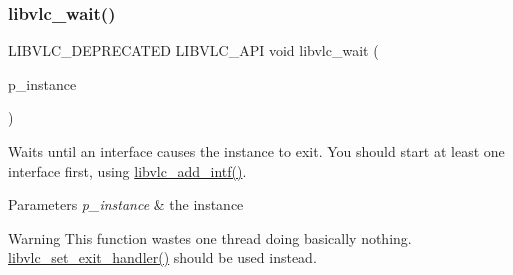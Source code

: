 \subsubsection{\texorpdfstring{libvlc\+\_\+wait()}{libvlc\_wait()}}
{\footnotesize\ttfamily L\+I\+B\+V\+L\+C\+\_\+\+D\+E\+P\+R\+E\+C\+A\+T\+ED L\+I\+B\+V\+L\+C\+\_\+\+A\+PI void libvlc\+\_\+wait (\begin{DoxyParamCaption}\item[{\hyperlink{group__libvlc__core_ga316d739a80da4678206c79f4d6c2e284}{libvlc\+\_\+instance\+\_\+t} $\ast$}]{p\+\_\+instance }\end{DoxyParamCaption})}

Waits until an interface causes the instance to exit. You should start at least one interface first, using \hyperlink{group__libvlc__core_gaee76d8daf854191af20a93eecea1dc6e}{libvlc\+\_\+add\+\_\+intf()}.


\begin{DoxyParams}{Parameters}
{\em p\+\_\+instance} & the instance \\
\hline
\end{DoxyParams}
\begin{DoxyWarning}{Warning}
This function wastes one thread doing basically nothing. \hyperlink{group__libvlc__core_ga9fb333dac01fe3e28bbf4256be87f006}{libvlc\+\_\+set\+\_\+exit\+\_\+handler()} should be used instead. 
\end{DoxyWarning}
